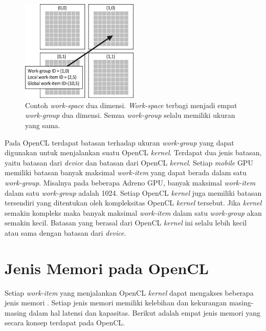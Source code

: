 \begin{figure}
	\centering
	\includegraphics[width=0.50\textwidth]
	{pics/opencl-work.jpg}
	\caption{Contoh \textit{work-space} dua dimensi. \textit{Work-space} terbagi menjadi empat \textit{work-group} dua dimensi. Semua \textit{work-group} selalu memiliki ukuran yang sama.}
	\label{fig:work}
\end{figure}

Pada OpenCL terdapat batasan terhadap ukuran \textit{work-group} yang dapat digunakan untuk menjalankan suatu OpenCL \textit{kernel}. Terdapat dua jenis batasan, yaitu batasan dari \textit{device} dan batasan dari OpenCL \textit{kernel}. Setiap \textit{mobile} GPU memiliki batasan banyak maksimal \textit{work-item} yang dapat berada dalam satu \textit{work-group}. Misalnya pada beberapa Adreno GPU, banyak maksimal \textit{work-item} dalam satu \textit{work-group} adalah 1024. Setiap OpenCL \textit{kernel} juga memiliki batasan tersendiri yang ditentukan oleh kompleksitas OpenCL \textit{kernel} tersebut. Jika \textit{kernel} semakin kompleks maka banyak maksimal \textit{work-item} dalam satu \textit{work-group} akan semakin kecil. Batasan yang berasal dari OpenCL \textit{kernel} ini selalu lebih kecil atau sama dengan batasan dari \textit{device}.

\section{Jenis Memori pada OpenCL}
Setiap \textit{work-item} yang menjalankan OpenCL \textit{kernel} dapat mengakses beberapa jenis memori \cite{opencl}. Setiap jenis memori memiliki kelebihan dan kekurangan masing-masing dalam hal latensi dan kapasitas. Berikut adalah empat jenis memori yang secara konsep terdapat pada OpenCL.

